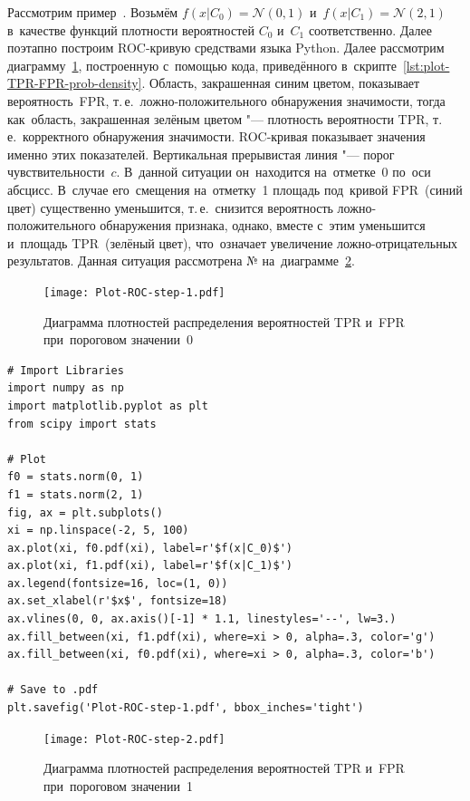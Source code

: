 \documentclass[]{scrreprt}
\begin{document}
Рассмотрим пример~\cite{AUC-Derivation}.  Возьмём  $f(x|C_{0}) = \mathcal{N}(0,1)$ и~$f(x|C_{1}) = \mathcal{N}(2,1)$ в~качестве функций плотности вероятностей $C_{0}$ и~$C_{1}$ соответственно. Далее поэтапно построим ROC-кривую средствами языка Python. Далее рассмотрим диаграмму~\ref{fig:plot-TPR-FPR-prob-density-1}, построенную с~помощью кода, приведённого в~скрипте~\ref{lst:plot-TPR-FPR-prob-density}. Область, закрашенная синим цветом, показывает вероятность~FPR, т.\,е.~ложно-положительного обнаружения значимости, тогда как~область, закрашенная зелёным цветом "--- плотность вероятности TPR, т.\,е.~корректного обнаружения значимости. ROC-кривая показывает значения именно этих показателей. Вертикальная прерывистая линия "--- порог чувствительности~$c$. В~данной ситуации он~находится на~отметке~0 по~оси абсцисс. В~случае его~смещения на~отметку~1 площадь под~кривой FPR~(синий цвет) существенно уменьшится, т.\,е.~снизится вероятность ложно-положительного обнаружения признака, однако, вместе с~этим уменьшится и~площадь TPR~(зелёный цвет), что~означает увеличение ложно-отрицательных результатов. Данная ситуация рассмотрена № на~диаграмме~\ref{fig:plot-TPR-FPR-prob-density-2}.  
%
\begin{figure}[ht]
	\centering
	\texttt{[image: Plot-ROC-step-1.pdf]}
	\caption{Диаграмма плотностей распределения вероятностей TPR и~FPR при~пороговом значении~0}
	\label{fig:plot-TPR-FPR-prob-density-1}
\end{figure}
%
\begin{lstlisting}[float, caption = Построение диаграммы плотностей распределения вероятностей TPR и~FPR, firstnumber=1, label= lst:plot-TPR-FPR-prob-density]
# Import Libraries
import numpy as np
import matplotlib.pyplot as plt
from scipy import stats

# Plot
f0 = stats.norm(0, 1)
f1 = stats.norm(2, 1)
fig, ax = plt.subplots()
xi = np.linspace(-2, 5, 100)
ax.plot(xi, f0.pdf(xi), label=r'$f(x|C_0)$')
ax.plot(xi, f1.pdf(xi), label=r'$f(x|C_1)$')
ax.legend(fontsize=16, loc=(1, 0))
ax.set_xlabel(r'$x$', fontsize=18)
ax.vlines(0, 0, ax.axis()[-1] * 1.1, linestyles='--', lw=3.)
ax.fill_between(xi, f1.pdf(xi), where=xi > 0, alpha=.3, color='g')
ax.fill_between(xi, f0.pdf(xi), where=xi > 0, alpha=.3, color='b')

# Save to .pdf
plt.savefig('Plot-ROC-step-1.pdf', bbox_inches='tight')
\end{lstlisting}
%
\begin{figure}[ht]
	\centering
	\texttt{[image: Plot-ROC-step-2.pdf]}
	\caption{Диаграмма плотностей распределения вероятностей TPR и~FPR при~пороговом значении~1}
	\label{fig:plot-TPR-FPR-prob-density-2}
\end{figure}
%
\end{document}
